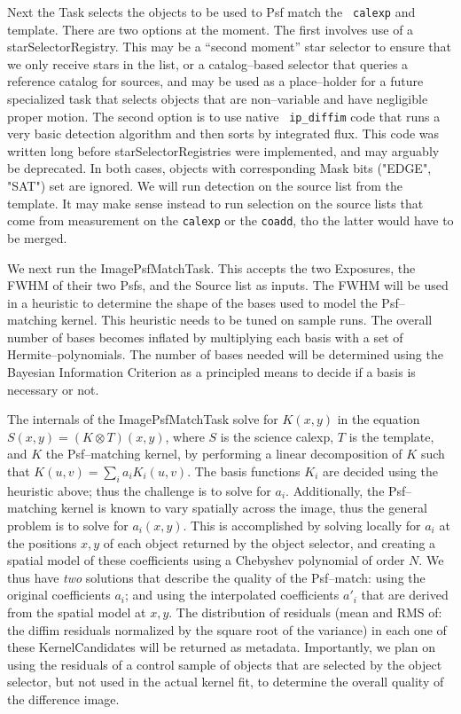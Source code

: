 \documentclass[12pt]{article}
\begin{document}
Next the Task selects the objects to be used to Psf match the {\tt
  calexp} and template.  There are two options at the moment.  The
first involves use of a starSelectorRegistry.  This may be a ``second
moment'' star selector to ensure that we only receive stars in the
list, or a catalog--based selector that queries a reference catalog
for sources, and may be used as a place--holder for a future
specialized task that selects objects that are non--variable and have
negligible proper motion.  The second option is to use native {\tt
  ip\_diffim} code that runs a very basic detection algorithm and then
sorts by integrated flux.  This code was written long before
starSelectorRegistries were implemented, and may arguably be
deprecated.  In both cases, objects with corresponding Mask bits
("EDGE", "SAT") set are ignored.  We will run detection on the source
list from the template.  It may make sense instead to run selection on
the source lists that come from measurement on the {\tt calexp} or the
{\tt coadd}, tho the latter would have to be merged.

We next run the ImagePsfMatchTask.  This accepts the two Exposures,
the FWHM of their two Psfs, and the Source list as inputs.  The FWHM
will be used in a heuristic to determine the shape of the bases used
to model the Psf--matching kernel.  This heuristic needs to be tuned
on sample runs.  The overall number of bases becomes inflated by
multiplying each basis with a set of Hermite--polynomials.  The number
of bases needed will be determined using the Bayesian Information
Criterion as a principled means to decide if a basis is necessary or
not.

The internals of the ImagePsfMatchTask solve for $K(x,y)$ in the
equation $S(x,y) = (K \otimes T)(x,y)$, where $S$ is the science
calexp, $T$ is the template, and $K$ the Psf--matching kernel, by
performing a linear decomposition of $K$ such that $K(u,v) = \sum_i
a_i K_i(u,v)$.  The basis functions $K_i$ are decided using the
heuristic above; thus the challenge is to solve for $a_i$.
Additionally, the Psf--matching kernel is known to vary spatially
across the image, thus the general problem is to solve for $a_i(x,y)$.
This is accomplished by solving locally for $a_i$ at the positions
$x,y$ of each object returned by the object selector, and creating a
spatial model of these coefficients using a Chebyshev polynomial of
order $N$.  We thus have {\it two} solutions that describe the quality
of the Psf--match: using the original coefficients $a_i$; and using
the interpolated coefficients $a{'}_i$ that are derived from the
spatial model at $x,y$.  The distribution of residuals (mean and RMS
of: the diffim residuals normalized by the square root of the
variance) in each one of these KernelCandidates will be returned as
metadata.  Importantly, we plan on using the residuals of a control
sample of objects that are selected by the object selector, but not
used in the actual kernel fit, to determine the overall quality of the
difference image.
\end{document}
